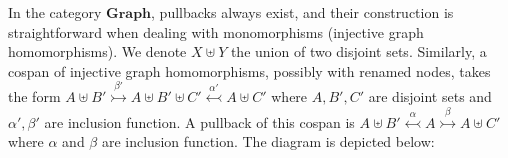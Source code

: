 In the category \(\mathbf{Graph}\), pullbacks always exist, and their construction is straightforward when dealing with monomorphisms (injective graph homomorphisms). 
We denote $X\uplus Y$ the union of two disjoint sets. 
Similarly, a cospan of injective graph homomorphisms, possibly with renamed nodes, takes the form
$
A \uplus B'  \overset{\beta'}{\rightarrowtail} A \uplus B' \uplus C'   \overset{\alpha'}{\leftarrowtail} A \uplus C'
$ where $A, B', C'$ are disjoint sets and $\alpha', \beta'$ are inclusion function. A pullback of this cospan is
$
A \uplus B' \overset{\alpha}{\leftarrowtail} A \overset{\beta}{\rightarrowtail} A \uplus C'
$ where $\alpha$ and $\beta$ are inclusion function.
The diagram is depicted below:

